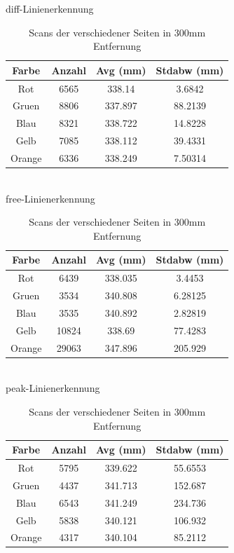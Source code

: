 \documentclass[ngerman,a4paper,parskip=half]{scrartcl}
\begin{document}
\begin{table}[H]
	\centering
	diff-Linienerkennung \\
	\begin{tabular}{c|c|c|c}
		Farbe & Anzahl & Avg (mm) & Stdabw (mm) \\ \hline
		Rot & 6565 & 338.14 & 3.6842 \\
		Gruen & 8806 & 337.897 & 88.2139 \\
		Blau & 8321 & 338.722 & 14.8228 \\
		Gelb & 7085 & 338.112 & 39.4331 \\
		Orange & 6336 & 338.249 & 7.50314 \\
	\end{tabular} \\
	\vspace{1em}
	free-Linienerkennung \\
		\begin{tabular}{c|c|c|c}
		Farbe & Anzahl & Avg (mm) & Stdabw (mm) \\ \hline
		Rot & 6439 & 338.035 & 3.4453 \\
		Gruen & 3534 & 340.808 & 6.28125 \\
		Blau & 3535 & 340.892 & 2.82819 \\
		Gelb & 10824 & 338.69 & 77.4283 \\
		Orange & 29063 & 347.896 & 205.929 \\
	\end{tabular} \\
	\vspace{1em}
	peak-Linienerkennung \\
		\begin{tabular}{c|c|c|c}
		Farbe & Anzahl & Avg (mm) & Stdabw (mm) \\ \hline
		Rot & 5795 & 339.622 & 55.6553 \\
		Gruen & 4437 & 341.713 & 152.687 \\
		Blau & 6543 & 341.249 & 234.736 \\
		Gelb & 5838 & 340.121 & 106.932 \\
		Orange & 4317 & 340.104 & 85.2112 \\
	\end{tabular} \
	\caption{Scans der verschiedener Seiten in 300mm Entfernung}
	\label{tab:colors}
\end{table}
\end{document}
